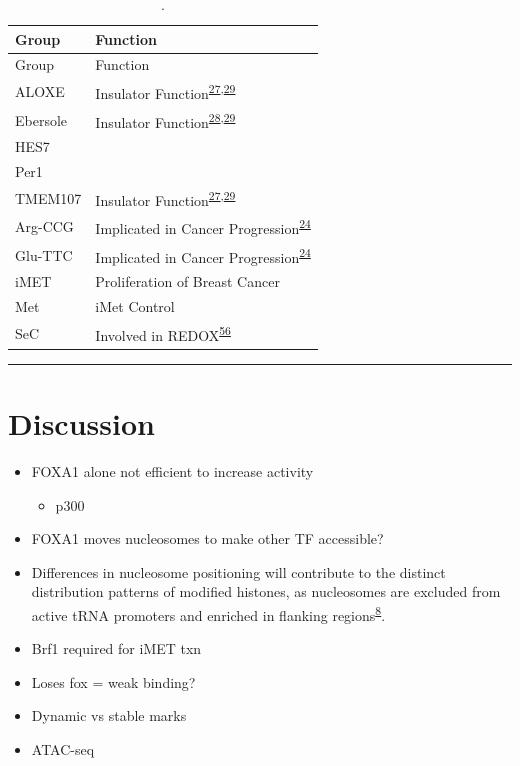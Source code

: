 \documentclass[
  11pt,
]{article}
\providecommand{\tightlist}{%
  \setlength{\itemsep}{0pt}\setlength{\parskip}{0pt}}
\begin{document}
\begin{longtable}[]{@{}ll@{}}
\caption{\label{tab:clusters}.}\tabularnewline
\toprule()
Group & Function \\
\midrule()
\endfirsthead
\toprule()
Group & Function \\
\midrule()
\endhead
ALOXE & Insulator Function\textsuperscript{\protect\hyperlink{ref-raab2011}{27},\protect\hyperlink{ref-sizer2022}{29}} \\
Ebersole & Insulator Function\textsuperscript{\protect\hyperlink{ref-Ebersole2011}{28},\protect\hyperlink{ref-sizer2022}{29}} \\
HES7 & \\
Per1 & \\
TMEM107 & Insulator Function\textsuperscript{\protect\hyperlink{ref-raab2011}{27},\protect\hyperlink{ref-sizer2022}{29}} \\
Arg-CCG & Implicated in Cancer Progression\textsuperscript{\protect\hyperlink{ref-Goodarzi2016}{24}} \\
Glu-TTC & Implicated in Cancer Progression\textsuperscript{\protect\hyperlink{ref-Goodarzi2016}{24}} \\
iMET & Proliferation of Breast Cancer \\
Met & iMet Control \\
SeC & Involved in REDOX\textsuperscript{\protect\hyperlink{ref-Sangha2022}{56}} \\
\bottomrule()
\end{longtable}

\begin{center}\rule{0.5\linewidth}{0.5pt}\end{center}

\hypertarget{discussion}{%
\section{Discussion}\label{discussion}}

\begin{itemize}
\item
  FOXA1 alone not efficient to increase activity

  \begin{itemize}
  \tightlist
  \item
    p300
  \end{itemize}
\item
  FOXA1 moves nucleosomes to make other TF accessible?
\item
  Differences in nucleosome positioning will contribute to the distinct distribution patterns of modified histones, as nucleosomes are excluded from active tRNA promoters and enriched in flanking regions\textsuperscript{\href{https://www.nature.com/articles/nrg3001\#ref-CR8}{8}}.
\item
  Brf1 required for iMET txn
\item
  Loses fox = weak binding?
\item
  Dynamic vs stable marks
\item
  ATAC-seq
\end{itemize}
\end{document}
